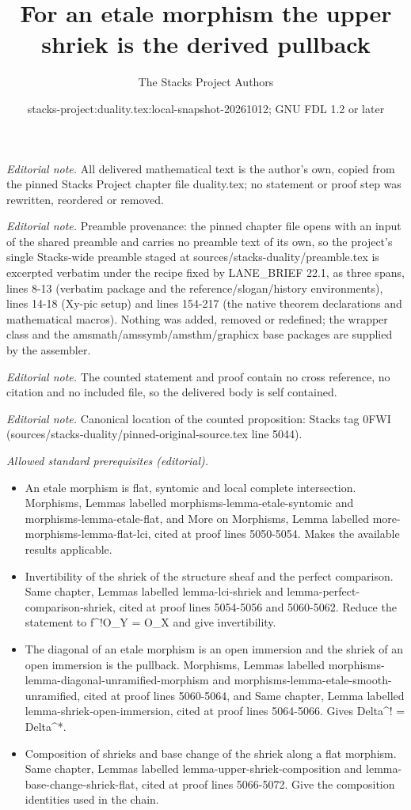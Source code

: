 \documentclass[10pt,a4paper]{amsart}
\title{For an etale morphism the upper shriek is the derived pullback}
\author{The Stacks Project Authors}
\date{stacks-project:duality.tex:local-snapshot-20261012; GNU FDL 1.2 or later}
\theoremstyle{plain}
\theoremstyle{definition}
\theoremstyle{remark}
\numberwithin{equation}{subsection}
\begin{document}
\maketitle
\noindent\textit{Editorial note.} All delivered mathematical text is the author's own, copied from the pinned Stacks Project chapter file duality.tex; no statement or proof step was rewritten, reordered or removed.\par\medskip
\noindent\textit{Editorial note.} Preamble provenance: the pinned chapter file opens with an input of the shared preamble and carries no preamble text of its own, so the project's single Stacks-wide preamble staged at sources/stacks-duality/preamble.tex is excerpted verbatim under the recipe fixed by LANE\_BRIEF 22.1, as three spans, lines 8-13 (verbatim package and the reference/slogan/history environments), lines 14-18 (Xy-pic setup) and lines 154-217 (the native theorem declarations and mathematical macros). Nothing was added, removed or redefined; the wrapper class and the amsmath/amssymb/amsthm/graphicx base packages are supplied by the assembler.\par\medskip
\noindent\textit{Editorial note.} The counted statement and proof contain no cross reference, no citation and no included file, so the delivered body is self contained.\par\medskip
\noindent\textit{Editorial note.} Canonical location of the counted proposition: Stacks tag 0FWI (sources/stacks-duality/pinned-original-source.tex line 5044).\par\medskip
\noindent\textit{Allowed standard prerequisites (editorial).}\begin{itemize}
\item An etale morphism is flat, syntomic and local complete intersection. Morphisms, Lemmas labelled morphisms-lemma-etale-syntomic and morphisms-lemma-etale-flat, and More on Morphisms, Lemma labelled more-morphisms-lemma-flat-lci, cited at proof lines 5050-5054. Makes the available results applicable.
\item Invertibility of the shriek of the structure sheaf and the perfect comparison. Same chapter, Lemmas labelled lemma-lci-shriek and lemma-perfect-comparison-shriek, cited at proof lines 5054-5056 and 5060-5062. Reduce the statement to f\textasciicircum{}!O\_Y = O\_X and give invertibility.
\item The diagonal of an etale morphism is an open immersion and the shriek of an open immersion is the pullback. Morphisms, Lemmas labelled morphisms-lemma-diagonal-unramified-morphism and morphisms-lemma-etale-smooth-unramified, cited at proof lines 5060-5064, and Same chapter, Lemma labelled lemma-shriek-open-immersion, cited at proof lines 5064-5066. Gives Delta\textasciicircum{}! = Delta\textasciicircum{}*.
\item Composition of shrieks and base change of the shriek along a flat morphism. Same chapter, Lemmas labelled lemma-upper-shriek-composition and lemma-base-change-shriek-flat, cited at proof lines 5066-5072. Give the composition identities used in the chain.
\end{itemize}\medskip
\end{document}
